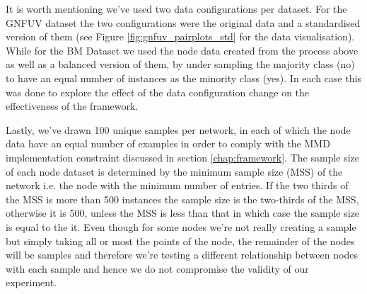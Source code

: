 \documentclass{mpaper}
\begin{document}
It is worth mentioning we've used two data configurations per dataset. For the GNFUV dataset the two configurations were the original data and a standardised version of them (see Figure \ref{fig:gnfuv_pairplots_std} for the data visualisation). While for the BM Dataset we used the node data created from the process above as well as a balanced version of them, by under sampling the majority class (no) to have an equal number of instances as the minority class (yes). In each case this was done to explore the effect of the data configuration change on the effectiveness of the framework. 

Lastly, we've drawn 100 unique samples per network, in each of which the node data have an equal number of examples in order to comply with the MMD implementation constraint discussed in section \ref{chap:framework}. The sample size of each node dataset is determined by the minimum sample size (MSS) of the network i.e. the node with the minimum number of entries. If the two thirds of the MSS is more than 500 instances the sample size is the two-thirds of the MSS, otherwise it is 500, unless the MSS is less than that in which case the sample size is equal to the it. Even though for some nodes we're not really creating a sample but simply taking all or most the points of the node, the remainder of the nodes will be samples and therefore we're testing a different relationship between nodes with each sample and hence we do not compromise the validity of our experiment.
\end{document}
